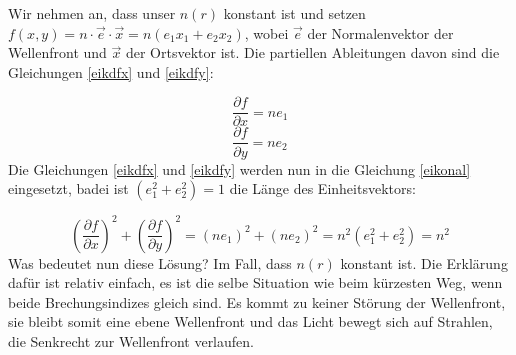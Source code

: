 \begin{refsection}
Wir nehmen an, dass
unser $n(r)$ konstant ist und setzen $f(x,y)=n\cdot\vec{e}\cdot\vec{x}=
n(e_{1}x_{1}+e_{2}x_{2})$, wobei $\vec{e}$ der Normalenvektor der
Wellenfront und $\vec{x}$ der Ortsvektor ist. Die partiellen Ableitungen
davon sind die Gleichungen \eqref{eikdfx} und \eqref{eikdfy}:

\begin{equation}\label{eikdfx}
\dfrac{\partial f}{\partial x} = ne_{1}
\end{equation}
\begin{equation}\label{eikdfy}
\dfrac{\partial f}{\partial y} = ne_{2}
\end{equation}
Die Gleichungen \eqref{eikdfx} und \eqref{eikdfy} werden nun in die Gleichung \eqref{eikonal} eingesetzt, badei ist $(e_{1}^{2}+e_{2}^{2})=1$ die Länge des Einheitsvektors:

\begin{equation}\label{lösung_eik}
\left( \dfrac{\partial f}{\partial x}\right)^{2} + \left( \dfrac{\partial f}{\partial y}\right) ^{2} = \left( ne_{1}\right) ^{2}+\left( ne_{2}\right)^{2}=n^{2}(e_{1}^{2}+e_{2}^{2})=n^{2}
\end{equation}
Was bedeutet nun diese Lösung? Im Fall, dass $n(r)$ konstant ist. Die Erklärung dafür ist relativ einfach, es ist die selbe Situation wie beim kürzesten Weg, wenn beide Brechungsindizes gleich sind. Es kommt zu keiner Störung der Wellenfront, sie bleibt somit eine ebene Wellenfront und das Licht bewegt sich auf Strahlen, die Senkrecht zur Wellenfront verlaufen.


\end{refsection}
